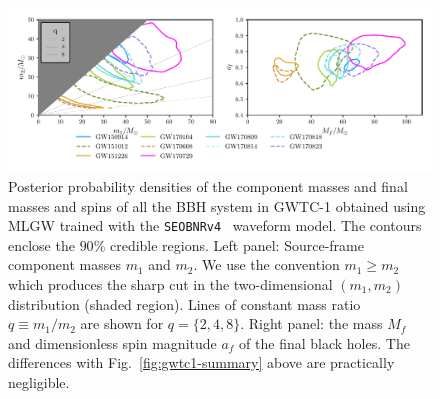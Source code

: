 \documentclass[twocolumn,showpacs,preprintnumbers,nofootinbib,prd,
superscriptaddress,10pt]{revtex4-1}
\begin{document}
\begin{figure}[t]
	\centering
    \includegraphics[width=\textwidth]{img/posterior_masses_final_seob.pdf}
	\caption{
	Posterior probability densities of the component masses and final masses and spins 
	of all the BBH system in GWTC-1 obtained using MLGW trained with the {\tt SEOBNRv4}~\cite{Bohe:2016gbl}
	waveform model. The contours enclose the $90\%$ credible regions.
	Left panel: Source-frame component masses $m_1$ and $m_2$. We use the convention $m_1\geq m_2$ which 
	produces the sharp cut in the two-dimensional $(m_1,m_2)$ distribution (shaded region). Lines of
	constant mass ratio $q\equiv m_1/m_2$ are shown for $q=\{2,4,8\}$. Right panel: the mass $M_f$
	and dimensionless spin magnitude $a_f$ of the final black holes. The differences with 
	Fig.~\ref{fig:gwtc1-summary} above are practically negligible.}
	\label{fig:gwtc1-summary_seob}
\end{figure}
\end{document}
